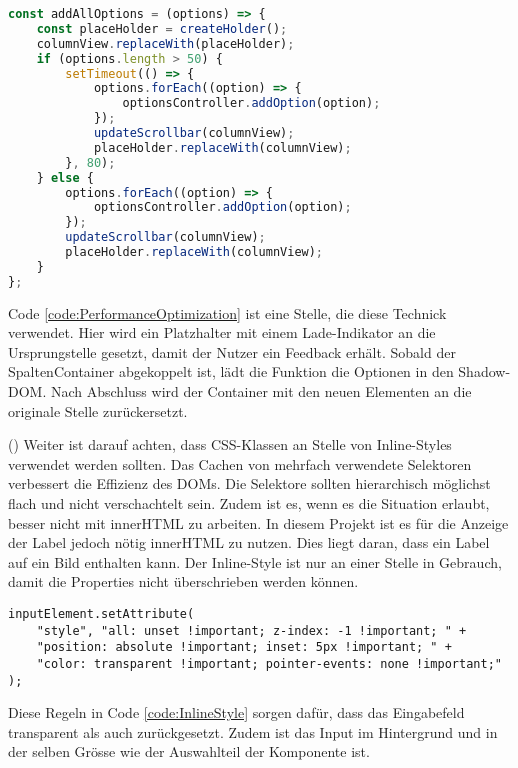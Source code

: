 \begin{lstlisting}[language = js, caption = Performance Optimierung (columnOptionsComponent.js), label = code:PerformanceOptimization]
const addAllOptions = (options) => {
    const placeHolder = createHolder();
    columnView.replaceWith(placeHolder);
    if (options.length > 50) {
        setTimeout(() => {
            options.forEach((option) => {
                optionsController.addOption(option);
            });
            updateScrollbar(columnView);
            placeHolder.replaceWith(columnView);
        }, 80);
    } else {
        options.forEach((option) => {
            optionsController.addOption(option);
        });
        updateScrollbar(columnView);
        placeHolder.replaceWith(columnView);
    }
};
\end{lstlisting}

Code \ref{code:PerformanceOptimization} ist eine Stelle, die diese Technick verwendet.
Hier wird ein Platzhalter mit einem Lade-Indikator an die Ursprungstelle gesetzt, damit der Nutzer ein Feedback erhält.
Sobald der SpaltenContainer abgekoppelt ist, lädt die Funktion die Optionen in den Shadow-DOM.
Nach Abschluss wird der Container mit den neuen Elementen an die originale Stelle zurückersetzt.

(\cite{efficientDomManipulation}) Weiter ist darauf achten, dass CSS-Klassen an Stelle von Inline-Styles verwendet werden sollten.
Das Cachen von mehrfach verwendete Selektoren verbessert die Effizienz des DOMs.
Die Selektore sollten hierarchisch möglichst flach und nicht verschachtelt sein.
Zudem ist es, wenn es die Situation erlaubt, besser nicht mit innerHTML zu arbeiten.
In diesem Projekt ist es für die Anzeige der Label jedoch nötig innerHTML zu nutzen.
Dies liegt daran, dass ein Label auf ein Bild enthalten kann.
Der Inline-Style ist nur an einer Stelle in Gebrauch, damit die Properties nicht überschrieben werden können.

\begin{lstlisting}[language = html5, caption = Inline-Style für Inputfeld, label = code:InlineStyle]
inputElement.setAttribute(
    "style", "all: unset !important; z-index: -1 !important; " +
    "position: absolute !important; inset: 5px !important; " +
    "color: transparent !important; pointer-events: none !important;"
);
\end{lstlisting}

Diese Regeln in Code \ref{code:InlineStyle} sorgen dafür, dass das Eingabefeld transparent als auch zurückgesetzt.
Zudem ist das Input im Hintergrund und in der selben Grösse wie der Auswahlteil der Komponente ist.

